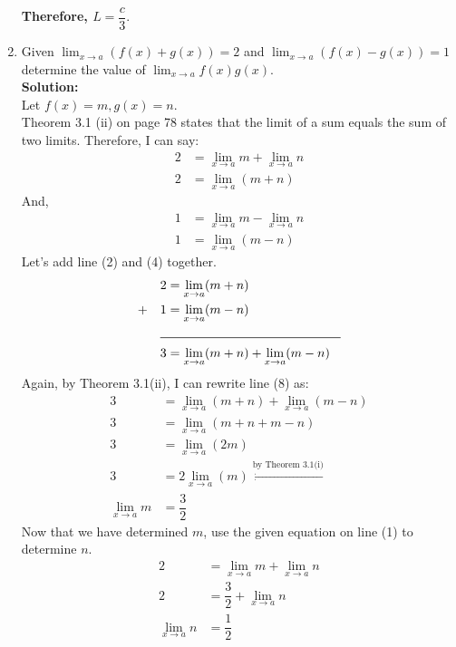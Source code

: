 \documentclass[12pt]{book}
\begin{document}
\begin{enumerate}
\textbf{Therefore, $L = \dfrac{c}{3}$}.

\newpage

\setcounter{equation}{0}
\item Given $\lim_{x\to a}\limits (f(x)+g(x))=2$ and $\lim_{x\to a}\limits (f(x)-g(x))=1$ determine the value of $\lim_{x\to a}\limits f(x)g(x)$.\\

\textbf{Solution:\\}
Let $f(x) = m, g(x) = n$.\\
Theorem 3.1 (ii) on page 78 states that the limit of a sum equals the sum of two limits. Therefore, I can say:
\begin{align}
    2 &= \lim_{x\to a}\limits m + \lim_{x\to a}\limits n \\
    2 &= \lim_{x\to a}\limits (m + n)
\end{align}
And,
\begin{align}
    1 &= \lim_{x\to a}\limits m - \lim_{x\to a}\limits n \\
    1 &= \lim_{x\to a}\limits (m - n)
\end{align}
Let's add line (2) and (4) together.
\begin{align}
    &2 = \lim_{x\to a}\limits (m + n) \\
    + \quad &1 = \lim_{x\to a}\limits (m - n) \\
    &\rule{5cm}{0.5pt}\\
    &3 = \lim_{x\to a}\limits (m + n) + \lim_{x\to a}\limits (m - n)
\end{align}
Again, by Theorem 3.1(ii), I can rewrite line (8) as:
\begin{align}
    3 &= \lim_{x\to a}\limits (m + n) + \lim_{x\to a}\limits (m - n)\\
    3 &= \lim_{x\to a}\limits (m + n + m - n)\\
    3 &= \lim_{x\to a}\limits (2m)\\
    3 &= 2\lim_{x\to a}\limits (m) \xleftarrow[]{\text{by Theorem 3.1(i)}}\\
    \lim_{x\to a}\limits m &= \dfrac{3}{2}
\end{align}
Now that we have determined $m$, use the given equation on line (1) to determine $n$.
\begin{align}
    2 &= \lim_{x\to a}\limits m + \lim_{x\to a}\limits n \\
    2 &= \dfrac{3}{2} + \lim_{x\to a}\limits n \\
    \lim_{x\to a}\limits n &= \dfrac{1}{2}
\end{align}\\


\end{enumerate}
\end{document}
